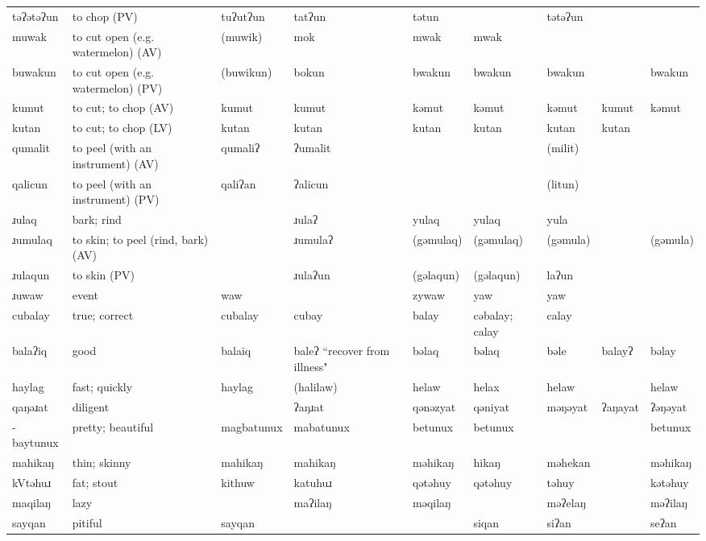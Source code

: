 \begin{landscape}
\begin{longtable}{*{9}{>{\raggedright\arraybackslash}p{}}}
\text{*}təʔətəʔun & to chop (PV) & tuʔutʔun & tatʔun & tətun &  & tətəʔun &  & \\
\text{*}muwak & to cut open (e.g. watermelon) (AV) & (muwik) & mok & mwak & mwak &  &  & \\
\text{*}buwakun & to cut open (e.g. watermelon) (PV) & (buwikun) & bokun & bwakun & bwakun & bwakun &  & bwakun\\
\text{*}kumut & to cut; to chop (AV) & kumut & kumut & kəmut & kəmut & kəmut & kumut & kəmut\\
\text{*}kutan & to cut; to chop (LV) & kutan & kutan & kutan & kutan & kutan & kutan & \\
\text{*}qumalit & to peel (with an instrument) (AV) & qumaliʔ & ʔumalit &  &  & (milit) &  & \\
\text{*}qalicun & to peel (with an instrument) (PV) & qaliʔan & ʔalicun &  &  & (litun) &  & \\
\text{*}ɹulaq & bark; rind &  & ɹulaʔ & yulaq & yulaq & yula &  & \\
\text{*}ɹumulaq & to skin; to peel (rind, bark) (AV) &  & ɹumulaʔ & (gəmulaq) & (gəmulaq) & (gəmula) &  & (gəmula)\\
\text{*}ɹulaqun & to skin (PV) &  & ɹulaʔun & (gəlaqun) & (gəlaqun) & laʔun &  & \\
\text{*}ɹuwaw & event & waw &  & zywaw & yaw & yaw &  & \\
\text{*}cubalay & true; correct & cubalay & cubay & balay & cəbalay; calay & calay &  & \\
\text{*}balaʔiq & good & balaiq & baleʔ ``recover from illness" & bəlaq & bəlaq & bəle & balayʔ & bəlay\\
\text{*}haylag & fast; quickly & haylag & (halilaw) & helaw & helax & helaw &  & helaw\\
\text{*}qaŋəɹat & diligent &  & ʔaŋɹat & qənəzyat & qəniyat & məŋəyat & ʔaŋayat & ʔəŋəyat\\
\text{*}-baytunux & pretty; beautiful & magbatunux & mabatunux & betunux & betunux &  &  & betunux\\
\text{*}mahikaŋ & thin; skinny & mahikaŋ & mahikaŋ & məhikaŋ & hikaŋ & məhekan &  & məhikaŋ\\
\text{*}kVtəhuɹ & fat; stout & kithuw & katuhuɹ & qətəhuy & qətəhuy & təhuy &  & kətəhuy\\
\text{*}maqilaŋ & lazy &  & maʔilaŋ & məqilaŋ &  & məʔelaŋ &  & məʔilaŋ\\
\text{*}sayqan & pitiful & sayqan &  &  & siqan & siʔan &  & seʔan\\

\end{longtable}
\end{landscape}

